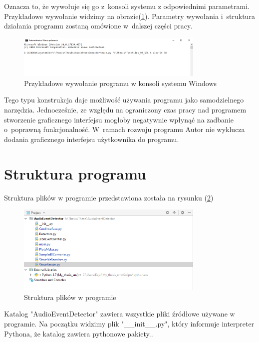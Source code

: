 \documentclass[eng,printmode]{mgr}
\begin{document}
Oznacza to, że wywołuje się go z~konsoli systemu z odpowiednimi parametrami. Przykładowe wywołanie widzimy na obrazie(\ref{wywolanie}). Parametry wywołania i~struktura działania programu zostaną omówione w~dalszej części pracy.
\begin{figure}[hbtp]
\label{wywolanie}
\caption{Przykładowe wywołanie programu w konsoli systemu Windows}
\centering
\includegraphics[width=0.8\textwidth]{cmd_wywolanie.PNG}
\end{figure}

Tego typu konstrukcja daje możliwość używania programu jako samodzielnego narzędzia. Jednocześnie, ze względu na ograniczony czas pracy nad programem stworzenie graficznego interfejsu mogłoby negatywnie wpłynąć na zadbanie o~poprawną funkcjonalność. W~ramach rozwoju programu Autor nie wyklucza dodania graficznego interfejsu użytkownika do programu.

\section{Struktura programu}
Struktura plików w programie przedstawiona została na rysunku (\ref{struktura})

\begin{figure}[hbtp]
\label{struktura}
\caption{Struktura plików w programie}
\centering
\includegraphics[width=0.8\textwidth]{struktura.PNG}
\end{figure}

Katalog "AudioEventDetector" zawiera wszystkie pliki źródłowe używane w programie. Na początku widzimy plik "\_\_init\_\_.py", który informuje interpreter Pythona, że 
katalog zawiera pythonowe pakiety.\cite{init}. 
\end{document}
